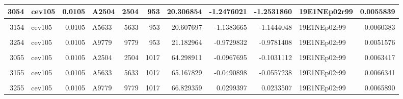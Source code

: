 \documentclass[
]{book}
\begin{document}
\begin{table}[!h]
{\begin{tabular}{r|l|r|l|r|r|r|r|r|l|r}
\hline
3054 & cev105 & 0.0105 & A2504 & 2504 & 953 & 20.306854 & -1.2476021 & -1.2531860 & 19E1NEp02r99 & 0.0055839\\
\hline
\cellcolor{gray!6}{3104} & \cellcolor{gray!6}{cev105} & \cellcolor{gray!6}{0.0105} & \cellcolor{gray!6}{A4145} & \cellcolor{gray!6}{4145} & \cellcolor{gray!6}{953} & \cellcolor{gray!6}{20.452876} & \cellcolor{gray!6}{-1.1916003} & \cellcolor{gray!6}{-1.1975215} & \cellcolor{gray!6}{19E1NEp02r99} & \cellcolor{gray!6}{0.0059211}\\
\hline
3154 & cev105 & 0.0105 & A5633 & 5633 & 953 & 20.607697 & -1.1383665 & -1.1444048 & 19E1NEp02r99 & 0.0060383\\
\hline
\cellcolor{gray!6}{3204} & \cellcolor{gray!6}{cev105} & \cellcolor{gray!6}{0.0105} & \cellcolor{gray!6}{A7274} & \cellcolor{gray!6}{7274} & \cellcolor{gray!6}{953} & \cellcolor{gray!6}{20.807359} & \cellcolor{gray!6}{-1.0766095} & \cellcolor{gray!6}{-1.0823344} & \cellcolor{gray!6}{19E1NEp02r99} & \cellcolor{gray!6}{0.0057250}\\
\hline
3254 & cev105 & 0.0105 & A9779 & 9779 & 953 & 21.182964 & -0.9729832 & -0.9781408 & 19E1NEp02r99 & 0.0051576\\
\hline
\cellcolor{gray!6}{3005} & \cellcolor{gray!6}{cev105} & \cellcolor{gray!6}{0.0105} & \cellcolor{gray!6}{A0} & \cellcolor{gray!6}{0} & \cellcolor{gray!6}{1017} & \cellcolor{gray!6}{63.774766} & \cellcolor{gray!6}{-0.1284542} & \cellcolor{gray!6}{-0.1342653} & \cellcolor{gray!6}{19E1NEp02r99} & \cellcolor{gray!6}{0.0058110}\\
\hline
3055 & cev105 & 0.0105 & A2504 & 2504 & 1017 & 64.298911 & -0.0967695 & -0.1031112 & 19E1NEp02r99 & 0.0063417\\
\hline
\cellcolor{gray!6}{3105} & \cellcolor{gray!6}{cev105} & \cellcolor{gray!6}{0.0105} & \cellcolor{gray!6}{A4145} & \cellcolor{gray!6}{4145} & \cellcolor{gray!6}{1017} & \cellcolor{gray!6}{64.720664} & \cellcolor{gray!6}{-0.0728485} & \cellcolor{gray!6}{-0.0793940} & \cellcolor{gray!6}{19E1NEp02r99} & \cellcolor{gray!6}{0.0065454}\\
\hline
3155 & cev105 & 0.0105 & A5633 & 5633 & 1017 & 65.167829 & -0.0490898 & -0.0557238 & 19E1NEp02r99 & 0.0066341\\
\hline
\cellcolor{gray!6}{3205} & \cellcolor{gray!6}{cev105} & \cellcolor{gray!6}{0.0105} & \cellcolor{gray!6}{A7274} & \cellcolor{gray!6}{7274} & \cellcolor{gray!6}{1017} & \cellcolor{gray!6}{65.744507} & \cellcolor{gray!6}{-0.0203378} & \cellcolor{gray!6}{-0.0269149} & \cellcolor{gray!6}{19E1NEp02r99} & \cellcolor{gray!6}{0.0065772}\\
\hline
3255 & cev105 & 0.0105 & A9779 & 9779 & 1017 & 66.829359 & 0.0299397 & 0.0233507 & 19E1NEp02r99 & 0.0065890\\
\hline
\end{tabular}}
\end{table}
\end{document}
